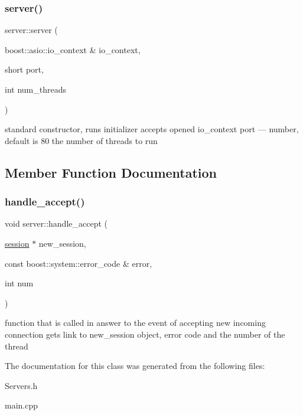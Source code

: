\subsubsection{\texorpdfstring{server()}{server()}}
{\footnotesize\ttfamily server\+::server (\begin{DoxyParamCaption}\item[{boost\+::asio\+::io\+\_\+context \&}]{io\+\_\+context,  }\item[{short}]{port,  }\item[{int}]{num\+\_\+threads }\end{DoxyParamCaption})\hspace{0.3cm}{\ttfamily [inline]}}

standard constructor, runs initializer accepts opened io\+\_\+context port --- number, default is 80 the number of threads to run 

\subsection{Member Function Documentation}
\mbox{\label{classserver_a195cc0f2e527393bb307cee99804d66a}} 
\subsubsection{\texorpdfstring{handle\+\_\+accept()}{handle\_accept()}}
{\footnotesize\ttfamily void server\+::handle\+\_\+accept (\begin{DoxyParamCaption}\item[{\hyperlink{classsession}{session} $\ast$}]{new\+\_\+session,  }\item[{const boost\+::system\+::error\+\_\+code \&}]{error,  }\item[{int}]{num }\end{DoxyParamCaption})}

function that is called in answer to the event of accepting new incoming connection gets link to new\+\_\+session object, error code and the number of the thread 

The documentation for this class was generated from the following files\+:\begin{DoxyCompactItemize}
\item 
Servers.\+h\item 
main.\+cpp\end{DoxyCompactItemize}
